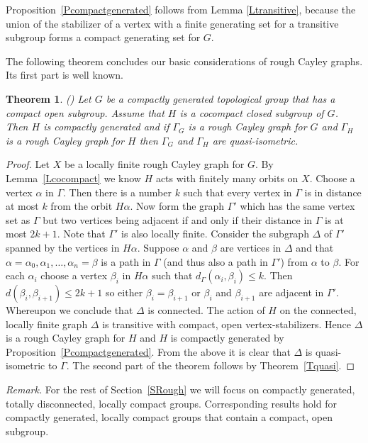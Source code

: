 \documentclass{emsprocart}
\newtheorem{theorem}{Theorem}[section]
\theoremstyle{definition}
\begin{document}
Proposition~\ref{Pcompactgenerated}
follows from Lemma \ref{Ltransitive}, because the union of the
stabilizer of a vertex with a finite generating set for a transitive subgroup
forms a compact generating set
for $G$.

The following theorem concludes our basic considerations of rough Cayley graphs.
Its first part is well known.

\begin{theorem} \label{TCocompact}
{\rm (\cite[Corollary~2.11]{KronMoller2008})}
Let $G$ be a compactly generated topological group  that
has a compact open subgroup.  Assume that $H$ is a cocompact closed
subgroup of $G$.  Then $H$ is compactly generated and if $\Gamma_G$ is a
rough Cayley graph for $G$ and $\Gamma_H$ is a rough Cayley graph for $H$
then $\Gamma_G$ and $\Gamma_H$ are quasi-isometric.
\end{theorem}

\begin{proof}  Let $X$ be a locally finite rough Cayley graph for $G$.  By
Lemma~\ref{Lcocompact} we know $H$ acts with finitely many orbits on $X$.
Choose a vertex $\alpha$ in $\Gamma$.
Then there is a number $k$ such that every vertex in $\Gamma$ is in
distance at most $k$ from the orbit $H\alpha$.   Now form the graph
$\Gamma'$ which has the same vertex set as $\Gamma$ but two
vertices being
adjacent if and only if their distance in $\Gamma$ is at most $2k+1$.
Note that $\Gamma'$ is also
locally finite.  Consider the subgraph
$\Delta$ of $\Gamma'$
spanned by the vertices in $H\alpha$.  Suppose $\alpha$ and $\beta$
are vertices in $\Delta$ and that $\alpha=\alpha_0,
\alpha_1, \ldots, \alpha_n=\beta$ is a path in
$\Gamma$ (and thus also a path in $\Gamma'$) from $\alpha$
to $\beta$.  For each $\alpha_i$
choose a vertex $\beta_i$ in $H\alpha$ such that
$d_\Gamma(\alpha_i, \beta_i)\leq k$.
Then $d(\beta_i, \beta_{i+1})\leq 2k+1$ so either
$\beta_i=\beta_{i+1}$
or $\beta_i$ and
$\beta_{i+1}$ are adjacent in $\Gamma'$.  Whereupon we conclude that
$\Delta$ is
connected.  The action of $H$ on the connected, locally finite graph $\Delta$ 
is transitive with compact, open vertex-stabilizers. Hence $\Delta$ 
is a rough Cayley graph for $H$ and $H$ is compactly generated 
by Proposition~\ref{Pcompactgenerated}.
  From the above it is clear that $\Delta$ is
quasi-isometric to $\Gamma$.  The second part of the theorem
follows by Theorem~\ref{Tquasi}.  \end{proof} 

{\em Remark.}  For the rest of Section~\ref{SRough} we will focus on compactly generated, totally disconnected, locally compact groups.
Corresponding results hold for compactly generated, locally compact groups that contain a compact, open subgroup.
\end{document}
